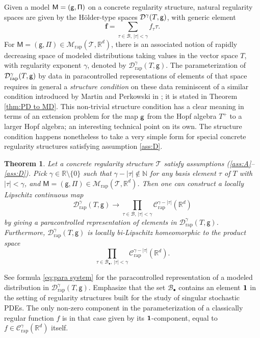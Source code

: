 \documentclass[10pt]{amsart}
\newcommand{\sbullet}{{\scriptscriptstyle\bullet}}
\theoremstyle{plain}
\newtheorem{thm}{Theorem}
\theoremstyle{definition}
\newcommand{\bsf}{\boldsymbol{f}}
\newcommand{\rap}{\mathrm{rap}}
\newcommand{\sfM}{\mathsf{M}}
\newcommand{\sfg}{\mathsf{g}}
\newcommand{\sfPi}{\mathsf{\Pi}}
\newcommand{\scrM}{\mathscr{M}}
\newcommand{\scrT}{\mathscr{T}}
\newcommand{\bbN}{\mathbb{N}}
\newcommand{\bbR}{\mathbb{R}}
\newcommand{\mcB}{\mathcal{B}}
\newcommand{\mcC}{\mathcal{C}}
\newcommand{\mcD}{\mathcal{D}}
\begin{document}
Given a model $\sf M=(g,\Pi)$ on a concrete regularity structure, natural regularity spaces are given by the Hölder-type spaces $\mcD^\gamma(T,\sf g)$, with generic element
\[
\bsf = \sum_{\tau\in\mcB,\, \vert\tau\vert < \gamma} f_\tau \tau.
\]
For $\sfM=(\sfg,\sfPi)\in\scrM_\rap(\scrT, \bbR^d)$, there is an associated notion of rapidly decreasing space of modeled distributions taking values in the vector space $T$, with regularity exponent $\gamma$, denoted by $\mcD_\rap^\gamma(T, \sfg)$. The parameterization of $\mcD_\rap^\gamma(T,\sf g)$ by data in paracontrolled representations of elements of that space requires in general a {\it structure condition} on these data reminiscent of a similar condition introduced by Martin and Perkowski in \cite{MP18}; it is stated in Theorem \ref{thm:PD to MD}. This non-trivial structure condition has a clear meaning in terms of an extension problem for the map $\sf g$ from the Hopf algebra $T^+$ to a larger Hopf algebra; an interesting technical point on its own. The structure condition happens nonetheless to take a very simple form for special concrete regularity structures satisfying assumption \eqref{ass:D}.


\begin{thm} \label{mainthm2}
Let a concrete regularity structure $\scrT$ satisfy assumptions \textup{(\ref{ass:A}--\ref{ass:D})}. Pick $\gamma\in\bbR\setminus\{0\}$ such that $\gamma-|\tau|\notin\bbN$ for any basis element $\tau$ of $T$ with $|\tau|<\gamma$, and $\sfM=(\sfg,\sfPi)\in\scrM_\rap(\scrT, \bbR^d)$. Then one can construct a locally Lipschitz continuous map\vspace*{-3pt}
\[
\mcD_\rap^\gamma(T,\sfg) \to \prod_{\tau\in\mcB,\, |\tau|<\gamma} \mcC_\rap^{\gamma-|\tau|}(\bbR^d)
\]
by giving a paracontrolled representation of elements in $\mcD_\rap^\gamma(T,\sfg)$. Furthermore, $\mcD_\rap^\gamma(T, \sfg)$ is locally bi-Lipschitz homeomorphic to the product space\vspace*{-3pt}\enlargethispage{.5\baselineskip}%
\[
\prod_{\tau\in\mcB_\sbullet,\, |\tau|<\gamma} \mcC_\rap^{\gamma-|\tau|}(\bbR^d).
\]
\end{thm}


See formula \eqref{eq:para system} for the paracontrolled representation of a modeled distribution in $\mcD_\rap^\gamma(T,\sfg)$. Emphasize that the set $\mcB_\sbullet$ contains an element $\bf 1$ in the setting of regularity structures built for the study of singular stochastic PDEs. The only non-zero component in the parameterization of a classically regular function $f$ is in that case given by its $\bf 1$-component, equal to $f\in\mcC^\gamma_\rap(\bbR^d)$ itself.
\end{document}

